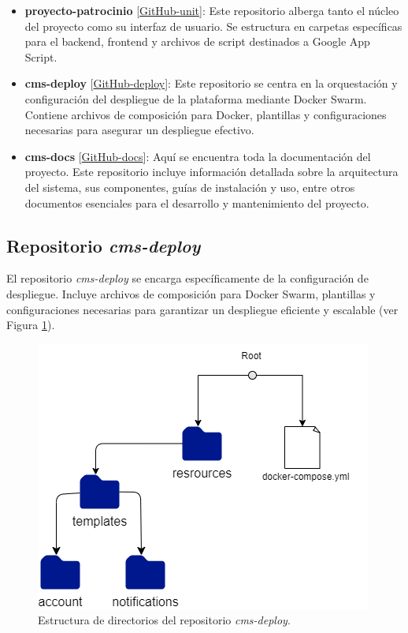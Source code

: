 \begin{itemize}
    \item \textbf{proyecto-patrocinio} [\href{https://github.com/proyecto-patrocinio}{GitHub-unit}]: Este repositorio alberga tanto el núcleo del proyecto como su interfaz de usuario. Se estructura en carpetas específicas para el backend, frontend y archivos de script destinados a Google App Script.
    
    \item \textbf{cms-deploy} [\href{https://github.com/proyecto-patrocinio/cms-deploy}{GitHub-deploy}]: Este repositorio se centra en la orquestación y configuración del despliegue de la plataforma mediante Docker Swarm. Contiene archivos de composición para Docker, plantillas y configuraciones necesarias para asegurar un despliegue efectivo.
    
    \item \textbf{cms-docs} [\href{https://github.com/proyecto-patrocinio/cms-docs}{GitHub-docs}]: Aquí se encuentra toda la documentación del proyecto. Este repositorio incluye información detallada sobre la arquitectura del sistema, sus componentes, guías de instalación y uso, entre otros documentos esenciales para el desarrollo y mantenimiento del proyecto.
\end{itemize}

\subsection{Repositorio \textit{cms-deploy}}\label{subsec:directory-deploy}

El repositorio \textit{cms-deploy} se encarga específicamente de la configuración de despliegue. Incluye archivos de composición para Docker Swarm, plantillas y configuraciones necesarias para garantizar un despliegue eficiente y escalable (ver Figura \ref{fig:deploy-directory}).


\begin{figure}[h]
    \centering
    \includegraphics[width=0.5\linewidth]{fig/deploy-directory.png}
    \caption{Estructura de directorios del repositorio \textit{cms-deploy}.}
    \label{fig:deploy-directory}
\end{figure}

